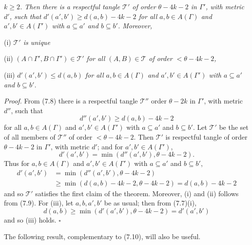 \noindent \textit{$k \ge 2$. Then there is a respectful tangle $\mathscr{T}'$ of order $\theta - 4k - 2$ in $\Gamma'$, with metric $d'$, such that $d'(a', b') \ge d(a, b) - 4k - 2$ for all $a, b \in A(\Gamma)$ and $a', b' \in A(\Gamma')$ with $a \subseteq a'$ and $b \subseteq b'$. Moreover,}

\hspace*{12pt}(i) \textit{$\mathscr{T}'$ is unique}

\hspace*{12pt}(ii) \textit{$(A \cap \Gamma', B \cap \Gamma') \in \mathscr{T}'$ for all $(A, B) \in \mathscr{T}$ of order $< \theta - 4k - 2$,}

\hspace*{12pt}(iii) \textit{$d'(a', b') \le d(a, b)$ for all $a, b \in A(\Gamma)$ and $a', b' \in A(\Gamma')$ with $a \subseteq a'$ and $b \subseteq b'$.}

\textit{Proof.} From (7.8) there is a respectful tangle $\mathscr{T}''$ order $\theta - 2k$ in $\Gamma'$, with metric $d''$, such that
\begin{equation*}
d''(a', b') \ge d(a, b) - 4k - 2
\end{equation*}
for all $a, b \in A(\Gamma)$ and $a', b' \in A(\Gamma')$ with $a \subseteq a'$ and $b \subseteq b'$. Let $\mathscr{T}'$ be the set of all members of $\mathscr{T}''$ of order $< \theta - 4k - 2$. Then $\mathscr{T}'$ is respectful tangle of order $\theta - 4k - 2$ in $\Gamma'$, with metric $d'$; and for $a', b' \in A(\Gamma')$,
\begin{equation*}
d'(a', b') = \min(d''(a', b'), \theta - 4k - 2).
\end{equation*}
Thus for $a, b \in A(\Gamma)$ and $a', b' \in A(\Gamma')$ with $a \subseteq a'$ and $b \subseteq b'$,
\begin{align*}
d'(a', b') &= \min(d''(a', b'), \theta - 4k - 2) \\
&\ge \min(d(a, b) - 4k - 2, \theta - 4k - 2) = d(a, b) - 4k - 2
\end{align*}
and so $\mathscr{T}'$ satisfies the first claim of the theorem. Moreover, (i) and (ii) follows from (7.9). For (iii), let $a, b, a', b'$ be as usual; then from (7.7)(i),
\begin{equation*}
d(a, b) \ge \min(d'(a', b'), \theta - 4k - 2) = d'(a', b')
\end{equation*}
and so (iii) holds. $\square$

The following result, complementary to (7.10), will also be useful.

